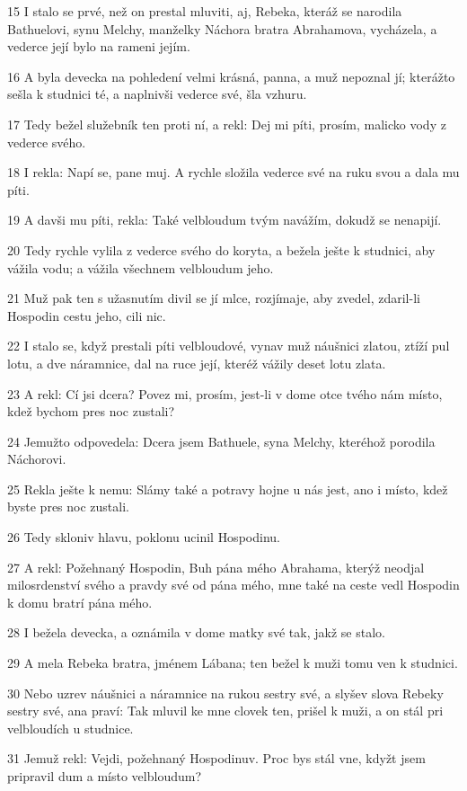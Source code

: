 \par 15 I stalo se prvé, než on prestal mluviti, aj, Rebeka, kteráž se narodila Bathuelovi, synu Melchy, manželky Náchora bratra Abrahamova, vycházela, a vederce její bylo na rameni jejím.
\par 16 A byla devecka na pohledení velmi krásná, panna, a muž nepoznal jí; kterážto sešla k studnici té, a naplnivši vederce své, šla vzhuru.
\par 17 Tedy bežel služebník ten proti ní, a rekl: Dej mi píti, prosím, malicko vody z vederce svého.
\par 18 I rekla: Napí se, pane muj. A rychle složila vederce své na ruku svou a dala mu píti.
\par 19 A davši mu píti, rekla: Také velbloudum tvým navážím, dokudž se nenapijí.
\par 20 Tedy rychle vylila z vederce svého do koryta, a bežela ješte k studnici, aby vážila vodu; a vážila všechnem velbloudum jeho.
\par 21 Muž pak ten s užasnutím divil se jí mlce, rozjímaje, aby zvedel, zdaril-li Hospodin cestu jeho, cili nic.
\par 22 I stalo se, když prestali píti velbloudové, vynav muž náušnici zlatou, ztíží pul lotu, a dve náramnice, dal na ruce její, kteréž vážily deset lotu zlata.
\par 23 A rekl: Cí jsi dcera? Povez mi, prosím, jest-li v dome otce tvého nám místo, kdež bychom pres noc zustali?
\par 24 Jemužto odpovedela: Dcera jsem Bathuele, syna Melchy, kteréhož porodila Náchorovi.
\par 25 Rekla ješte k nemu: Slámy také a potravy hojne u nás jest, ano i místo, kdež byste pres noc zustali.
\par 26 Tedy skloniv hlavu, poklonu ucinil Hospodinu.
\par 27 A rekl: Požehnaný Hospodin, Buh pána mého Abrahama, kterýž neodjal milosrdenství svého a pravdy své od pána mého, mne také na ceste vedl Hospodin k domu bratrí pána mého.
\par 28 I bežela devecka, a oznámila v dome matky své tak, jakž se stalo.
\par 29 A mela Rebeka bratra, jménem Lábana; ten bežel k muži tomu ven k studnici.
\par 30 Nebo uzrev náušnici a náramnice na rukou sestry své, a slyšev slova Rebeky sestry své, ana praví: Tak mluvil ke mne clovek ten, prišel k muži, a on stál pri velbloudích u studnice.
\par 31 Jemuž rekl: Vejdi, požehnaný Hospodinuv. Proc bys stál vne, kdyžt jsem pripravil dum a místo velbloudum?
